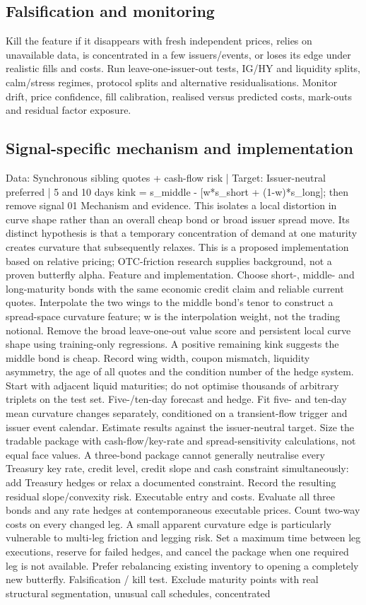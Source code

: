 \documentclass[10pt]{article}
\begin{document}
\subsection{Falsification and monitoring}
Kill the feature if it disappears with fresh independent prices, relies on unavailable data, is concentrated in a few issuers/events, or loses its edge under realistic fills and costs. Run leave-one-issuer-out tests, IG/HY and liquidity splits, calm/stress regimes, protocol splits and alternative residualisations. Monitor drift, price confidence, fill calibration, realised versus predicted costs, mark-outs and residual factor exposure.
\subsection{Signal-specific mechanism and implementation}
Data: Synchronous sibling quotes + cash-flow risk  |  Target: Issuer-neutral preferred  |  5 and 10 days kink = s\_middle - [w*s\_short + (1-w)*s\_long]; then remove signal 01 Mechanism and evidence.  This isolates a local distortion in curve shape rather than an overall cheap bond or broad issuer spread move. Its distinct hypothesis is that a temporary concentration of demand at one maturity creates curvature that subsequently relaxes. This is a proposed implementation based on relative pricing; OTC-friction research supplies background, not a proven butterfly alpha. Feature and implementation.  Choose short-, middle- and long-maturity bonds with the same economic credit claim and reliable current quotes. Interpolate the two wings to the middle bond’s tenor to construct a spread-space curvature feature; w is the interpolation weight, not the trading notional. Remove the broad leave-one-out value score and persistent local curve shape using training-only regressions. A positive remaining kink suggests the middle bond is cheap. Record wing width, coupon mismatch, liquidity asymmetry, the age of all quotes and the condition number of the hedge system. Start with adjacent liquid maturities; do not optimise thousands of arbitrary triplets on the test set. Five-/ten-day forecast and hedge.  Fit five- and ten-day mean curvature changes separately, conditioned on a transient-flow trigger and issuer event calendar. Estimate results against the issuer-neutral target. Size the tradable package with cash-flow/key-rate and spread-sensitivity calculations, not equal face values. A three-bond package cannot generally neutralise every Treasury key rate, credit level, credit slope and cash constraint simultaneously: add Treasury hedges or relax a documented constraint. Record the resulting residual slope/convexity risk. Executable entry and costs.  Evaluate all three bonds and any rate hedges at contemporaneous executable prices. Count two-way costs on every changed leg. A small apparent curvature edge is particularly vulnerable to multi-leg friction and legging risk. Set a maximum time between leg executions, reserve for failed hedges, and cancel the package when one required leg is not available. Prefer rebalancing existing inventory to opening a completely new butterfly. Falsification / kill test.  Exclude maturity points with real structural segmentation, unusual call schedules, concentrated 
\end{document}
